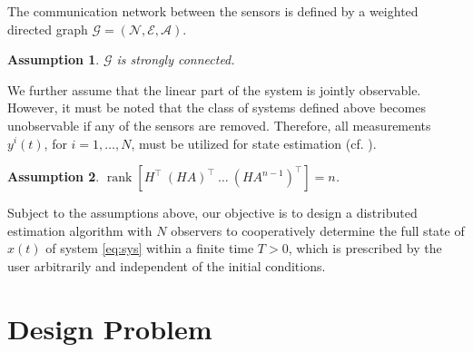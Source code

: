 \documentclass[journal]{IEEEtran}
\newtheorem{assumption}{Assumption}
\newtheorem{remark}{Remark}
\newcommand{\rank}{\operatorname{rank}}
\def\T{\top}
\begin{document}
The communication network between the sensors is defined by a weighted directed graph $\mathcal G=(\mathcal N,\mathcal E,\mathcal A)$.

\begin{assumption} \label{as:strongcon}
    $\mathcal{G}$ is strongly connected. 
\end{assumption}

We further assume that the linear part of the system is jointly observable. However, it must be noted that the class of systems defined above becomes unobservable if any of the sensors are removed. Therefore, all measurements $y^i(t)$, for $i=1,\dots,N$, must be utilized for state estimation (cf. \cite{Yuanqing22}). 


\begin{assumption} \label{as:jointobs}
   $\rank[H^\T ~ (HA)^\T ~ \dots ~ (HA^{n-1})^\T] = n$.
\end{assumption}

Subject to the assumptions above, our objective is to design a distributed estimation algorithm with $N$ observers to cooperatively determine the full state of $x(t)$ of system \eqref{eq:sys} within a finite time $T>0$, which is prescribed by the user arbitrarily and independent of the initial conditions.



\section{Design Problem}
\end{document}
